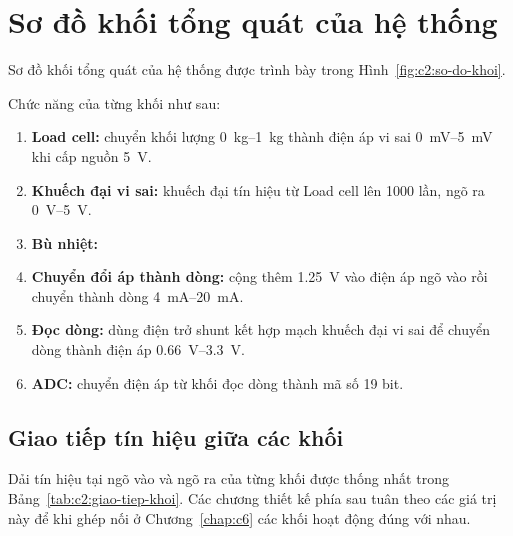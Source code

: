 
\section{Sơ đồ khối tổng quát của hệ thống}
\label{sec:c2:so-do-khoi}

Sơ đồ khối tổng quát của hệ thống được trình bày trong Hình~\ref{fig:c2:so-do-khoi}.


Chức năng của từng khối như sau:
\begin{enumerate}
    \item \textbf{Load cell:} chuyển khối lượng \qtyrange{0}{1}{\kilo\gram} thành điện áp vi sai
          \qtyrange{0}{5}{\milli\volt} khi cấp nguồn \qty{5}{\volt}.
    \item \textbf{Khuếch đại vi sai:} khuếch đại tín hiệu từ Load cell lên 1000 lần, ngõ ra
          \qtyrange{0}{5}{\volt}.
    \item \textbf{Bù nhiệt:} 
    \item \textbf{Chuyển đổi áp thành dòng:} cộng thêm \qty{1.25}{\volt} vào điện áp ngõ vào rồi
          chuyển thành dòng \qtyrange{4}{20}{\milli\ampere}.
    \item \textbf{Đọc dòng:} dùng điện trở shunt kết hợp mạch khuếch đại vi sai để chuyển dòng thành
          điện áp \qtyrange{0.66}{3.3}{\volt}.
    \item \textbf{ADC:} chuyển điện áp từ khối đọc dòng thành mã số 19 bit.
\end{enumerate}

\subsection{Giao tiếp tín hiệu giữa các khối}
\label{sec:c2:giao-tiep-khoi}

Dải tín hiệu tại ngõ vào và ngõ ra của từng khối được thống nhất trong
Bảng~\ref{tab:c2:giao-tiep-khoi}. Các chương thiết kế phía sau tuân theo các giá trị này
để khi ghép nối ở Chương~\ref{chap:c6} các khối hoạt động đúng với nhau.

